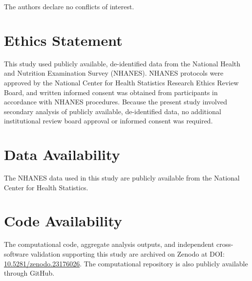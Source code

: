 \documentclass[11pt]{article}
\begin{document}
The authors declare no conflicts of interest.

\section*{Ethics Statement}

This study used publicly available, de-identified data from the National
Health and Nutrition Examination Survey (NHANES). NHANES protocols were
approved by the National Center for Health Statistics Research Ethics
Review Board, and written informed consent was obtained from participants
in accordance with NHANES procedures. Because the present study involved
secondary analysis of publicly available, de-identified data, no
additional institutional review board approval or informed consent was
required.

\section*{Data Availability}

The NHANES data used in this study are publicly available from the
National Center for Health Statistics.

\section*{Code Availability}

The computational code, aggregate analysis outputs, and independent
cross-software validation supporting this study are archived on Zenodo at DOI:
\href{https://doi.org/10.5281/zenodo.23176026}{10.5281/zenodo.23176026}.
The computational repository is also publicly available through GitHub.




\end{document}
